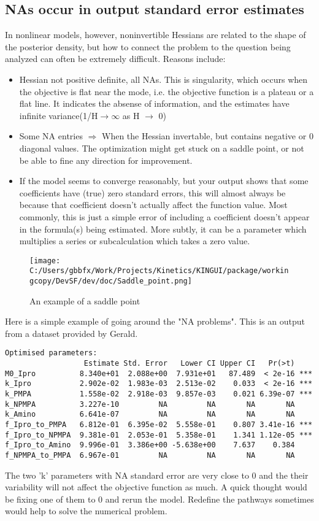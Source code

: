 \documentclass{article}
\begin{document}
\subsection{NAs occur in output standard error estimates}
In nonlinear models, however, noninvertible Hessians are related to
the shape of the posterior density, but how to connect the problem to
the question being analyzed can often be extremely difficult.
Reasons include:
\begin{itemize}
	\item Hessian not positive definite, all NAs. This is
          singularity, which occurs when the objective is flat near
          the mode, i.e. the objective function is a plateau or a flat
          line. It indicates the absense of information, and the
          estimates have infinite variance(1/H${\rightarrow}\infty$ as H ${\rightarrow}$ 0)

\item  Some NA entries $\Rightarrow$ When the Hessian invertable, but
  contains negative or 0 diagonal values. The optimization might get
  stuck on a saddle point, or not be able to fine any direction for improvement.
\item If the model seems to converge reasonably, but your output shows
  that some coefficients have (true) zero standard errors, this will
  almost always be because that
coefficient doesn’t actually affect the function value. Most commonly, this is just a
simple error of including a coefficient doesn’t appear in the
formula(s) being estimated. More subtly, it can be a parameter which
multiplies a series or subcalculation which takes a zero value.
\end{itemize}
\begin{figure}[hbtp]
\centering
\texttt{[image: C:/Users/gbbfx/Work/Projects/Kinetics/KINGUI/package/workingcopy/DevSF/dev/doc/Saddle\_point.png]}
\caption{An example of a saddle point}
\end{figure}

Here is a simple example of going around the "NA problems". This is an output from a dataset provided by Gerald.

\begin{verbatim}
Optimised parameters:
                  Estimate Std. Error   Lower CI Upper CI   Pr(>t)
M0_Ipro          8.340e+01  2.088e+00  7.931e+01   87.489  < 2e-16 ***
k_Ipro           2.902e-02  1.983e-03  2.513e-02    0.033  < 2e-16 ***
k_PMPA           1.558e-02  2.918e-03  9.857e-03    0.021 6.39e-07 ***
k_NPMPA          3.227e-10         NA         NA       NA       NA
k_Amino          6.641e-07         NA         NA       NA       NA
f_Ipro_to_PMPA   6.812e-01  6.395e-02  5.558e-01    0.807 3.41e-16 ***
f_Ipro_to_NPMPA  9.381e-01  2.053e-01  5.358e-01    1.341 1.12e-05 ***
f_Ipro_to_Amino  9.996e-01  3.386e+00 -5.638e+00    7.637    0.384
f_NPMPA_to_PMPA  6.967e-01         NA         NA       NA       NA
\end{verbatim}
The two 'k' parameters with NA standard error are very close to 0 and the their
  variability will not affect the objective function as much. A quick thought would be fixing one of them to 0 and rerun the model. Redefine the pathways sometimes would help to solve the numerical problem.
\end{document}
